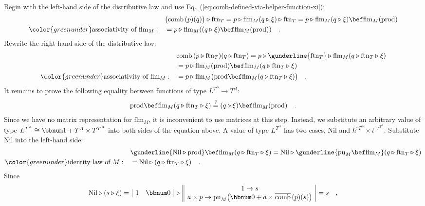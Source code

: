 Begin with the left-hand side of the distributive law and use Eq.~(\ref{eq:comb-defined-via-helper-function-xi}):
\begin{align*}
 & \big(\text{comb}\,(p)(q)\big)\triangleright\text{ftn}_{T}=p\triangleright\text{flm}_{M}(q\triangleright\xi)\triangleright\text{ftn}_{T}=p\triangleright\text{flm}_{M}(q\triangleright\xi)\bef\text{flm}_{M}(\text{prod})\\
{\color{greenunder}\text{associativity of }\text{flm}_{M}:}\quad & =p\triangleright\text{flm}_{M}((q\triangleright\xi)\bef\text{flm}_{M}(\text{prod}))\quad.
\end{align*}
Rewrite the right-hand side of the distributive law:
\begin{align*}
 & \text{comb}\,(p\triangleright\text{ftn}_{T})(q\triangleright\text{ftn}_{T})=p\triangleright\gunderline{\text{ftn}_{T}}\triangleright\text{flm}_{M}(q\triangleright\text{ftn}_{T}\triangleright\xi)\\
 & =p\triangleright\text{flm}_{M}(\text{prod})\bef\text{flm}_{M}(q\triangleright\text{ftn}_{T}\triangleright\xi)\\
{\color{greenunder}\text{associativity of }\text{flm}_{M}:}\quad & =p\triangleright\text{flm}_{M}\big(\text{prod}\bef\text{flm}_{M}(q\triangleright\text{ftn}_{T}\triangleright\xi)\big)\quad.
\end{align*}
It remains to prove the following equality between functions of type
$L^{T^{A}}\rightarrow T^{A}$:
\[
\text{prod}\bef\text{flm}_{M}(q\triangleright\text{ftn}_{T}\triangleright\xi)\overset{?}{=}(q\triangleright\xi)\bef\text{flm}_{M}(\text{prod})\quad.
\]
Since we have no matrix representation for $\text{flm}_{M}$, it is
inconvenient to use matrices at this step. Instead, we substitute
an arbitrary value of type $L^{T^{A}}\cong\bbnum 1+T^{A}\times T^{T^{A}}$
into both sides of the equation above. A value of type $L^{T^{A}}$
has two cases, $\text{Nil}$ and $h^{:T^{A}}\times t^{:T^{T^{A}}}\!$.
Substitute $\text{Nil}$ into the left-hand side:
\begin{align*}
 & \gunderline{\text{Nil}\triangleright\text{prod}}\bef\text{flm}_{M}(q\triangleright\text{ftn}_{T}\triangleright\xi)=\text{Nil}\triangleright\gunderline{\text{pu}_{M}\bef\text{flm}_{M}}(q\triangleright\text{ftn}_{T}\triangleright\xi)\\
{\color{greenunder}\text{identity law of }M:}\quad & =\text{Nil}\triangleright(q\triangleright\text{ftn}_{T}\triangleright\xi)\quad.
\end{align*}
Since 
\[
\text{Nil}\triangleright(s\triangleright\xi)=\,\begin{array}{|cc|}
1 & \bbnum 0\end{array}\,\triangleright\,\begin{array}{||c|}
1\rightarrow s\\
a\times p\rightarrow\text{pu}_{M}\big(\bbnum 0+a\times\overline{\text{comb}}\,(p)(s)\big)
\end{array}\,=s\quad,
\]
